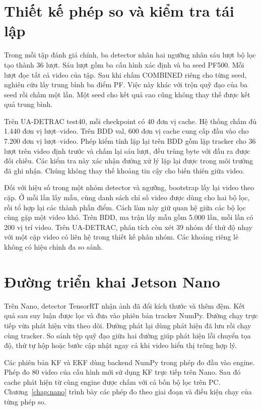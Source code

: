 \section{Thiết kế phép so và kiểm tra tái lập}
Trong mỗi tập đánh giá chính, ba detector nhân hai ngưỡng nhân sáu lượt bộ lọc tạo thành 36 lượt. Sáu lượt gồm ba cấu hình xác định và ba seed PF500. Mỗi lượt đọc tất cả video của tập. Sau khi chấm COMBINED riêng cho từng seed, nghiên cứu lấy trung bình ba điểm PF. Việc này khác với trộn quỹ đạo của ba seed rồi chấm một lần. Một seed cho kết quả cao cũng không thay thế được kết quả trung bình.

Trên UA-DETRAC test40, mỗi checkpoint có 40 đơn vị cache. Hệ thống chấm đủ 1.440 đơn vị lượt--video. Trên BDD val, 600 đơn vị cache cung cấp đầu vào cho 7.200 đơn vị lượt--video. Phép kiểm tính lặp lại trên BDD gồm lặp tracker cho 36 lượt trên video định trước và chấm lại sáu lượt, đều trùng byte với đầu ra được đối chiếu. Các kiểm tra này xác nhận đường xử lý lặp lại được trong môi trường đã ghi nhận. Chúng không thay thế khoảng tin cậy cho biến thiên giữa video.

Đối với hiệu số trong một nhóm detector và ngưỡng, bootstrap lấy lại video theo cặp. Ở mỗi lần lấy mẫu, cùng danh sách chỉ số video được dùng cho hai bộ lọc, rồi tổ hợp lại các thành phần điểm. Cách làm này giữ quan hệ giữa các bộ lọc cùng gặp một video khó. Trên BDD, ma trận lấy mẫu gồm 5.000 lần, mỗi lần có 200 vị trí video. Trên UA-DETRAC, phân tích còn xét 39 nhóm để thử độ nhạy với một cặp video có liên hệ trong thiết kế phân nhóm. Các khoảng riêng lẻ không có hiệu chỉnh đa so sánh.

\section{Đường triển khai Jetson Nano}
Trên Nano, detector TensorRT nhận ảnh đã đổi kích thước và thêm đệm. Kết quả sau suy luận được lọc và đưa vào phiên bản tracker NumPy. Đường chạy trực tiếp vừa phát hiện vừa theo dõi. Đường phát lại dùng phát hiện đã lưu rồi chạy cùng tracker. So sánh tệp quỹ đạo giữa hai đường giúp phát hiện lỗi chuyển tọa độ, thứ tự hộp hoặc bước cập nhật ngay cả khi video hiển thị trông hợp lý.

Các phiên bản KF và EKF dùng backend NumPy trong phép đo đầu vào engine. Phép đo 80 video của cấu hình mới sử dụng KF trực tiếp trên Nano. Sau đó cache phát hiện từ cùng engine được chấm với cả bốn bộ lọc trên PC. Chương~\ref{chap:nano} trình bày các phép đo theo giai đoạn và điều kiện chạy của từng phép so.
